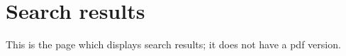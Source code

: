 \chapter{Search results}
\hypertarget{index}{}\label{index}


 

This is the page which displays search results; it does not have a pdf version.

 